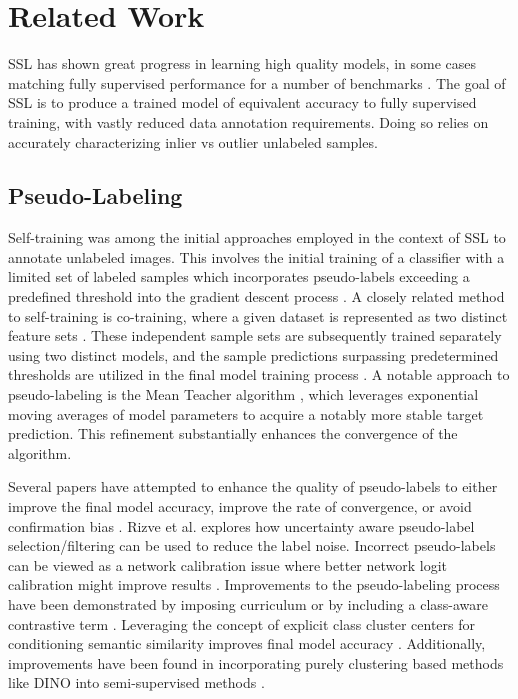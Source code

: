 \documentclass[10pt,twocolumn,letterpaper]{article}
\begin{document}
\section{Related Work}


SSL has shown great progress in learning high quality models, in some cases matching fully supervised performance for a number of benchmarks \cite{zhang2021flexmatch}.
The goal of SSL is to produce a trained model of equivalent accuracy to fully supervised training, with vastly reduced data annotation requirements.
Doing so relies on accurately characterizing inlier vs outlier unlabeled samples.

\subsection{Pseudo-Labeling}
Self-training was among the initial approaches employed in the context of SSL to annotate unlabeled images. 
This involves the initial training of a classifier with a limited set of labeled samples which incorporates pseudo-labels exceeding a predefined threshold into the gradient descent process \cite{yarowsky1995unsupervised, mcclosky2006reranking, olivier2006semi,zhai2019s4l,livieris2019predicting,rosenberg2005semi,menon2020deep}. 
A closely related method to self-training is co-training, where a given dataset is represented as two distinct feature sets \cite{blum1998combining}. 
These independent sample sets are subsequently trained separately using two distinct models, and the sample predictions surpassing predetermined thresholds are utilized in the final model training process \cite{blum1998combining,prakash2014survey}.
A notable approach to pseudo-labeling is the Mean Teacher algorithm \cite{tarvainen2017mean}, which leverages exponential moving averages of model parameters to acquire a notably more stable target prediction. 
This refinement substantially enhances the convergence of the algorithm.

Several papers have attempted to enhance the quality of pseudo-labels to either improve the final model accuracy, improve the rate of convergence, or avoid confirmation bias \cite{arazo2020pseudo}.
Rizve et al. \cite{rizve2021defense} explores how uncertainty aware pseudo-label selection/filtering can be used to reduce the label noise.
Incorrect pseudo-labels can be viewed as a network calibration issue \cite{rizve2021defense} where better network logit calibration might improve results \cite{Xing2020DistanceBased}.
Improvements to the pseudo-labeling process have been demonstrated by imposing curriculum \cite{zhang2021flexmatch} or by including a class-aware contrastive term \cite{yang2022class}.
Leveraging the concept of explicit class cluster centers for conditioning semantic similarity improves final model accuracy \cite{zheng2022simmatch}.
Additionally, improvements have been found in incorporating purely clustering based methods like DINO \cite{caron2021emerging} into semi-supervised methods \cite{fini2023semi}.
\end{document}
